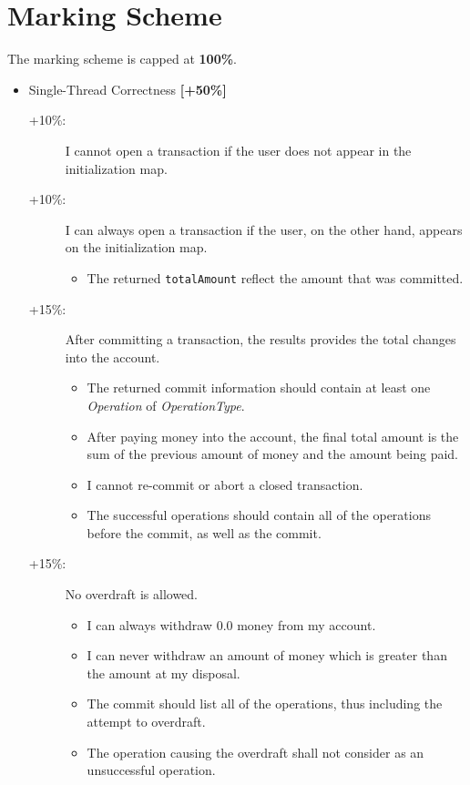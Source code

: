 \documentclass{article}
\begin{document}
	\section*{Marking Scheme}
	The marking scheme is capped at  \textbf{100\%}.
	\begin{itemize}
		\item Single-Thread Correctness \textbf{[+50\%]}
			\begin{description}
			\item [+10\%:] I cannot open a transaction if the user does not appear in the initialization map.
			\item [+10\%:] I can always open a transaction if the user, on the other hand, appears on the initialization map.
			\begin{itemize}
				\item The returned \texttt{totalAmount} reflect the amount that was committed.
			\end{itemize}
			\item [+15\%:] After committing a transaction, the results provides the total changes into the account.
			\begin{itemize}
				\item The returned commit information should contain at least one \textit{Operation} of \textit{OperationType}.
				\item After paying money into the account, the final total amount is the sum of the previous amount of money and the amount being paid.
				\item I cannot re-commit or abort a closed transaction.
				\item The successful operations should contain all of the operations before the commit, as well as the commit.
			\end{itemize}
			\item [+15\%: ] No overdraft is allowed.
			\begin{itemize}
				\item I can always withdraw $0.0$ money from my account.
				\item I can never withdraw an amount of money which is greater than the amount at my disposal.
				\item The commit should list all of the operations, thus including the attempt to overdraft.
				\item The operation causing the overdraft shall not consider as an unsuccessful operation.
			\end{itemize}
	
		\end{description}



\end{itemize}
\end{document}
